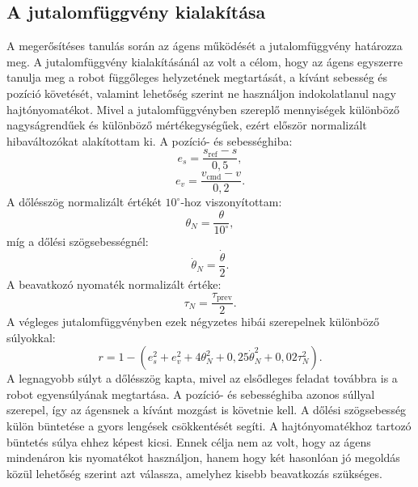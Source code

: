 \documentclass[12pt,a4paper]{report}
\begin{document}
	\subsection{A jutalomfüggvény kialakítása}
	A megerősítéses tanulás során az ágens működését a jutalomfüggvény határozza meg. A jutalomfüggvény kialakításánál az volt a célom, hogy az ágens egyszerre tanulja meg a robot függőleges helyzetének megtartását, a kívánt sebesség és pozíció követését, valamint lehetőség szerint ne használjon indokolatlanul nagy hajtónyomatékot.
	\newline
	\newline
	Mivel a jutalomfüggvényben szereplő mennyiségek különböző nagyságrendűek és különböző mértékegységűek, ezért először normalizált hibaváltozókat alakítottam ki. A pozíció- és sebességhiba:
	\begin{equation}
		e_s
		=
		\frac{s_{\mathrm{ref}}-s}{0{,}5},
	\end{equation}
	\begin{equation}
		e_v
		=
		\frac{v_{\mathrm{cmd}}-v}{0{,}2}.
	\end{equation}
	A dőlésszög normalizált értékét $10^\circ$-hoz viszonyítottam:
	\begin{equation}
		\theta_N
		=
		\frac{\theta}{10^\circ},
	\end{equation}
	míg a dőlési szögsebességnél:
	\begin{equation}
		\dot{\theta}_N
		=
		\frac{\dot{\theta}}{2}.
	\end{equation}
	A beavatkozó nyomaték normalizált értéke:
	\begin{equation}
		\tau_N
		=
		\frac{\tau_{\mathrm{prev}}}{2}.
	\end{equation}
	\newline
	\newline
	A végleges jutalomfüggvényben ezek négyzetes hibái szerepelnek különböző súlyokkal:
	\begin{equation}
		r
		=
		1-
		\left(
		e_s^2
		+
		e_v^2
		+
		4\theta_N^2
		+
		0{,}25\dot{\theta}_N^2
		+
		0{,}02\tau_N^2
		\right).
	\end{equation}
	A legnagyobb súlyt a dőlésszög kapta, mivel az elsődleges feladat továbbra is a robot egyensúlyának megtartása. A pozíció- és sebességhiba azonos súllyal szerepel, így az ágensnek a kívánt mozgást is követnie kell. A dőlési szögsebesség külön büntetése a gyors lengések csökkentését segíti.
	\newline
	\newline
	A hajtónyomatékhoz tartozó büntetés súlya ehhez képest kicsi. Ennek célja nem az volt, hogy az ágens mindenáron kis nyomatékot használjon, hanem hogy két hasonlóan jó megoldás közül lehetőség szerint azt válassza, amelyhez kisebb beavatkozás szükséges.
\end{document}
